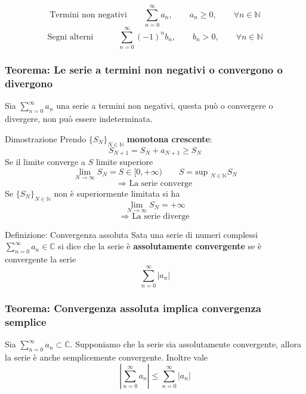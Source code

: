 \documentclass[x11names]{article}
\begin{document}
	\[ 
	\text{Termini non negativi} \qquad \sum_{n=0}^{\infty} a_{n}, \qquad a_{n} \geq 0, \qquad \forall n \in \mathbb{N}
	\]
	\[ 
	\text{Segni alterni} \quad \qquad \sum_{n=0}^{\infty} (-1)^nb_{n}, \qquad b_{n} > 0, \qquad \forall n \in \mathbb{N}
	\]
	\begin{center}
		\colorbox{myred}{\begin{minipage}{5.75in}
				\begin{redes}{}
					\subsubsection{Teorema: Le serie a termini non negativi o convergono o divergono}
					Sia \(\sum_{n=0}^\infty a_{n}\) una serie a termini non negativi, questa può o convergere o divergere, non può essere indeterminata.
				\end{redes}
		\end{minipage}}        
	\end{center}
	\begin{es}{Dimostrazione}
		Prendo \(\{S_{N}\}_{N\in\mathbb{N}}\) \textbf{monotona crescente}:
		\[ 
		S_{N+1} = S_{N} + a_{N+1} \geq S_{N}
		\]
		Se il limite converge a \(S\) limite superiore 
		\[ 
		\lim_{N\to\infty} S_{N} = S \in [0,+\infty)  \qquad S = \text{sup }_{N\in\mathbb{N}} S_{N}
		\]
		\[ 
		\Longrightarrow \text{ La serie converge}
		\]
		Se \(\{S_{N}\}_{N\in\mathbb{N}}\) non è superiormente limitata si ha 
		\[ 
		\lim_{N\to\infty} S_{N} = +\infty
		\]
		\[ 
		\Longrightarrow \text{ La serie diverge}
		\]
		
	\end{es}
	
	\begin{center}
		\colorbox{myblue}{\begin{minipage}{5.75in}
				\begin{blues}{Definizione: Convergenza assoluta}
					Sata una serie di numeri complessi \(\sum_{n=0}^{\infty} a_{n} \in \mathbb{C}\) si dice che la serie è \textbf{assolutamente convergente} se è convergente la serie
					\[ 
					\sum_{n=0}^{\infty} |a_{n}|
					\]
				\end{blues}
		\end{minipage}}       
	\end{center}
	\begin{center}
		\colorbox{myred}{\begin{minipage}{5.75in}
				\begin{redes}{}
					\subsubsection{Teorema: Convergenza assoluta implica convergenza semplice}
					Sia \(\sum_{n=0}^{\infty} a_{n} \subset \mathbb{C}\). Supponiamo che la serie sia assolutamente convergente, allora la serie è anche semplicemente convergente. Inoltre vale
					\[ 
					\left|\sum_{n=0}^{\infty} a_{n}\right| \leq \sum_{n=0}^{\infty} |a_{n}|
					\]
				\end{redes}
		\end{minipage}}        
	\end{center}
	
\end{document}
